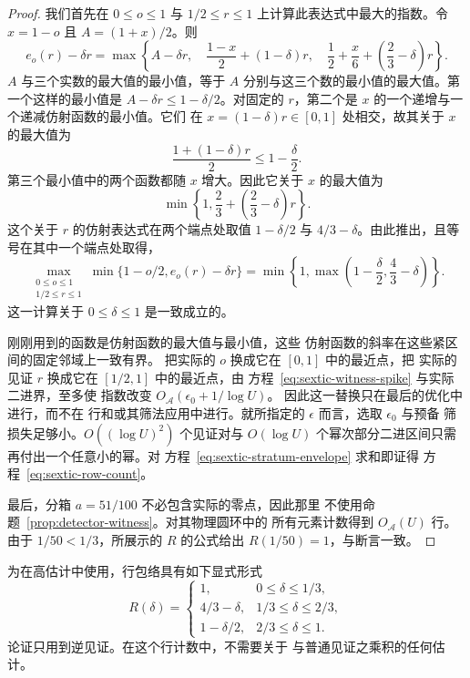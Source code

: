 \documentclass[11pt,a4paper]{article}
\numberwithin{equation}{section}
\numberwithin{figure}{section}
\theoremstyle{definition}
\theoremstyle{remark}
\begin{document}
\begin{proof}
我们首先在
$0\le o\le1$ 与 $1/2\le r\le1$ 上计算此表达式中最大的指数。令 $x=1-o$ 且 $A=(1+x)/2$。则
\[
 e_o(r)-\delta r
 =\max\left\{
 A-\delta r,\quad
 \frac{1-x}{2}+(1-\delta)r,\quad
 \frac12+\frac x6+\left(\frac23-\delta\right)r
 \right\}.
\]
$A$ 与三个实数的最大值的最小值，等于 $A$ 分别与这三个数的最小值的最大值。第一个这样的最小值是
$A-\delta r\le1-\delta/2$。对固定的 $r$，第二个是
$x$ 的一个递增与一个递减仿射函数的最小值。它们
在 $x=(1-\delta)r\in[0,1]$ 处相交，故其关于 $x$ 的最大值为
\[
 \frac{1+(1-\delta)r}{2}\le1-\frac\delta2.
\]
第三个最小值中的两个函数都随 $x$ 增大。因此它关于
$x$ 的最大值为
\[
 \min\left\{1,\frac23+\left(\frac23-\delta\right)r\right\}.
\]
这个关于 $r$ 的仿射表达式在两个端点处取值 $1-\delta/2$ 与
$4/3-\delta$。由此推出，且等号在其中一个端点处取得，
\begin{equation}\label{eq:sextic-envelope-optimization}
 \max_{\substack{0\le o\le1\\1/2\le r\le1}}
 \min\{1-o/2,e_o(r)-\delta r\}
 =\min\left\{1,\max\left(1-\frac\delta2,\frac43-\delta\right)\right\}.
\end{equation}
这一计算关于 $0\le\delta\le1$ 是一致成立的。

刚刚用到的函数是仿射函数的最大值与最小值，这些
仿射函数的斜率在这些紧区间的固定邻域上一致有界。
把实际的 $o$ 换成它在 $[0,1]$ 中的最近点，把
实际的见证 $r$ 换成它在 $[1/2,1]$ 中的最近点，由
方程~\eqref{eq:sextic-witness-spike} 与实际二进界，至多使
指数改变 $O_{\mathcal A}(\epsilon_0+1/\log U)$。
因此这一替换只在最后的优化中进行，而不在
行和或其筛法应用中进行。就所指定的 $\epsilon$ 而言，选取 $\epsilon_0$ 与预备
筛损失足够小。$O((\log U)^2)$ 个见证对与 $O(\log U)$ 个幂次部分二进区间只需
再付出一个任意小的幂。对
方程~\eqref{eq:sextic-stratum-envelope} 求和即证得
方程~\eqref{eq:sextic-row-count}。

最后，分箱 $a=51/100$ 不必包含实际的零点，因此那里
不使用命题~\ref{prop:detector-witness}。对其物理圆环中的
所有元素计数得到 $O_{\mathcal A}(U)$ 行。由于
$1/50<1/3$，所展示的 $R$ 的公式给出 $R(1/50)=1$，与断言一致。
\end{proof}

为在高估计中使用，行包络具有如下显式形式
\[
 R(\delta)=
 \begin{cases}
  1,&0\le\delta\le1/3,\\
  4/3-\delta,&1/3\le\delta\le2/3,\\
  1-\delta/2,&2/3\le\delta\le1.
 \end{cases}
\]
论证只用到逆见证。在这个行计数中，不需要关于
与普通见证之乘积的任何估计。
\end{document}
